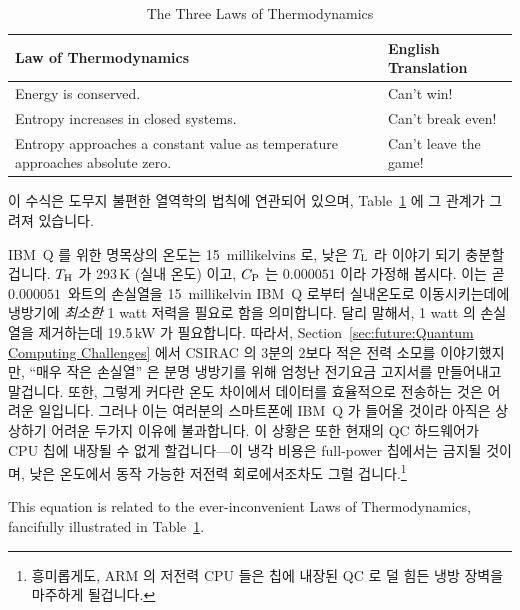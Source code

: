 \begin{table}
\renewcommand*{\arraystretch}{1.25}
\centering\footnotesize
\begin{tabular}{p{1.7in}p{0.95in}}
\toprule
Law of Thermodynamics
	& English Translation \\
\midrule
Energy is conserved.
	& Can't win! \\
Entropy increases in closed systems.
	& Can't break even! \\
Entropy approaches a constant value as temperature approaches absolute zero.
	& Can't leave the game! \\
\bottomrule
\end{tabular}
\caption{The Three Laws of Thermodynamics}
\label{tab:future:The Three Laws of Thermodynamics}
\end{table}

이 수식은 도무지 불편한 열역학의 법칙에 연관되어 있으며,
Table~\ref{tab:future:The Three Laws of Thermodynamics} 에 그 관계가 그려져
있습니다.

IBM~Q 를 위한 명목상의 온도는 15~millikelvins 로, 낮은 $T_\mathrm{L}$ 라 이야기 되기
충분할 겁니다.
$T_\mathrm{H}$ 가 293\,K (실내 온도) 이고, $C_\mathrm{P}$ 는 $0.000051$ 이라 가정해 봅시다.
이는 곧 $0.000051$~와트의 손실열을 15~millikelvin IBM~Q 로부터 실내온도로
이동시키는데에 냉방기에 \emph{최소한} 1 watt 저력을 필요로 함을 의미합니다.
달리 말해서, 1 watt 의 손실열을 제거하는데 19.5\,kW 가 필요합니다.
따라서,
Section~\ref{sec:future:Quantum Computing Challenges} 에서 CSIRAC 의 3분의
2보다 적은 전력 소모를 이야기했지만, ``매우 작은 손실열'' 은 분명 냉방기를 위해
엄청난 전기요금 고지서를 만들어내고 말겁니다.
또한, 그렇게 커다란 온도 차이에서 데이터를 효율적으로 전송하는 것은 어려운
일입니다.
그러나 이는 여러분의 스마트폰에 IBM~Q 가 들어올 것이라 아직은 상상하기 어려운
두가지 이유에 불과합니다.
이 상황은 또한 현재의 QC 하드웨어가 CPU 칩에 내장될 수 없게 할겁니다---이 냉각
비용은 full-power 칩에서는 금지될 것이며, 낮은 온도에서 동작 가능한 저전력
회로에서조차도 그럴 겁니다.\footnote{
	흥미롭게도, ARM 의 저전력 CPU 들은 칩에 내장된 QC 로 덜 힘든 냉방
	장벽을 마주하게 될겁니다.}
\iffalse

This equation is related to the ever-inconvenient Laws of Thermodynamics,
fancifully illustrated in
Table~\ref{tab:future:The Three Laws of Thermodynamics}.

